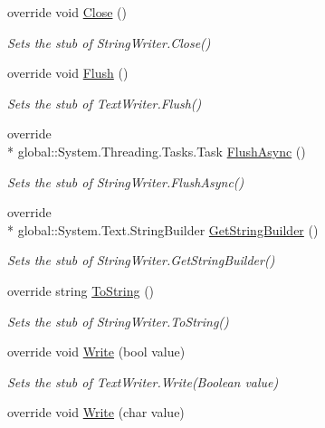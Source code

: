 \begin{DoxyCompactItemize}
override void \hyperlink{class_system_1_1_i_o_1_1_fakes_1_1_stub_string_writer_a931ff5e66359c98cc36f444860779a66}{Close} ()
\begin{DoxyCompactList}\small\item\em Sets the stub of String\-Writer.\-Close()\end{DoxyCompactList}\item 
override void \hyperlink{class_system_1_1_i_o_1_1_fakes_1_1_stub_string_writer_ad4be012afc6b55b025e2d5612962eb31}{Flush} ()
\begin{DoxyCompactList}\small\item\em Sets the stub of Text\-Writer.\-Flush()\end{DoxyCompactList}\item 
override \\*
global\-::\-System.\-Threading.\-Tasks.\-Task \hyperlink{class_system_1_1_i_o_1_1_fakes_1_1_stub_string_writer_ad5abf265662b947c3f6daadab6f0a7bd}{Flush\-Async} ()
\begin{DoxyCompactList}\small\item\em Sets the stub of String\-Writer.\-Flush\-Async()\end{DoxyCompactList}\item 
override \\*
global\-::\-System.\-Text.\-String\-Builder \hyperlink{class_system_1_1_i_o_1_1_fakes_1_1_stub_string_writer_af4be71dcb8516999d46b9e6ffb470998}{Get\-String\-Builder} ()
\begin{DoxyCompactList}\small\item\em Sets the stub of String\-Writer.\-Get\-String\-Builder()\end{DoxyCompactList}\item 
override string \hyperlink{class_system_1_1_i_o_1_1_fakes_1_1_stub_string_writer_a07dfd9941c8c15cf6537c2a318f8da27}{To\-String} ()
\begin{DoxyCompactList}\small\item\em Sets the stub of String\-Writer.\-To\-String()\end{DoxyCompactList}\item 
override void \hyperlink{class_system_1_1_i_o_1_1_fakes_1_1_stub_string_writer_ae6b8fad12637549b8752774ec3e34343}{Write} (bool value)
\begin{DoxyCompactList}\small\item\em Sets the stub of Text\-Writer.\-Write(\-Boolean value)\end{DoxyCompactList}\item 
override void \hyperlink{class_system_1_1_i_o_1_1_fakes_1_1_stub_string_writer_a1e1f05d4bf4df853652ab91b21bfb7ad}{Write} (char value)

\end{DoxyCompactItemize}
